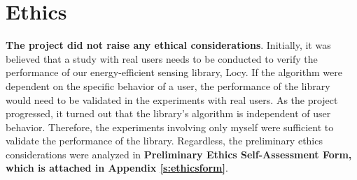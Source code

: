 \section{Ethics}
\label{s:ethics}
\hspace{10pt} \textbf{The project did not raise any ethical considerations}. Initially, it was believed that a study with real users needs to be conducted to verify the performance of our energy-efficient sensing library, Locy. If the algorithm were dependent on the specific behavior of a user, the performance of the library would need to be validated in the experiments with real users. As the project progressed, it turned out that the library's algorithm is independent of user behavior. Therefore, the experiments involving only myself were sufficient to validate the performance of the library. Regardless, the preliminary ethics considerations were analyzed in \textbf{Preliminary Ethics Self-Assessment Form, which is attached in Appendix \ref{s:ethicsform}}.
